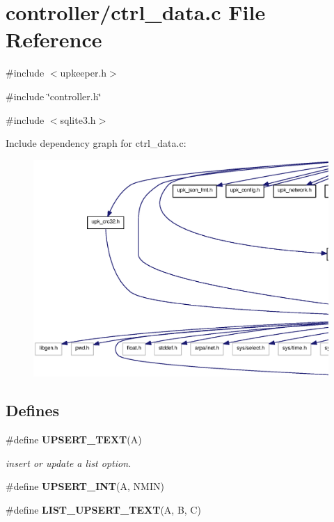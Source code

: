 \section{controller/ctrl\_\-data.c File Reference}
\label{ctrl__data_8c}
{\ttfamily \#include $<$upkeeper.h$>$}\par
{\ttfamily \#include \char`\"{}controller.h\char`\"{}}\par
{\ttfamily \#include $<$sqlite3.h$>$}\par
Include dependency graph for ctrl\_\-data.c:
\nopagebreak
\begin{figure}[H]
\begin{center}
\leavevmode
\includegraphics[width=400pt]{ctrl__data_8c__incl}
\end{center}
\end{figure}
\subsection*{Defines}
\begin{DoxyCompactItemize}
\item 
\#define {\bf UPSERT\_\-TEXT}(A)
\begin{DoxyCompactList}\small\item\em insert or update a list option. \end{DoxyCompactList}\item 
\#define {\bf UPSERT\_\-INT}(A, NMIN)
\item 
\#define {\bf LIST\_\-UPSERT\_\-TEXT}(A, B, C)
\end{DoxyCompactItemize}
